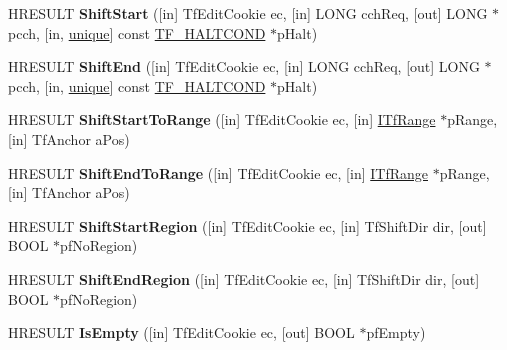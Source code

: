\begin{DoxyCompactItemize}
H\+R\+E\+S\+U\+LT {\bfseries Shift\+Start} (\mbox{[}in\mbox{]} Tf\+Edit\+Cookie ec, \mbox{[}in\mbox{]} L\+O\+NG cch\+Req, \mbox{[}out\mbox{]} L\+O\+NG $\ast$pcch, \mbox{[}in, \hyperlink{interfaceunique}{unique}\mbox{]} const \hyperlink{struct_i_tf_range_1_1_t_f___h_a_l_t_c_o_n_d}{T\+F\+\_\+\+H\+A\+L\+T\+C\+O\+ND} $\ast$p\+Halt)
\item 
\mbox{\label{interface_i_tf_range_a9195f598bcfd24904ea856f74e9dafe5}} 
H\+R\+E\+S\+U\+LT {\bfseries Shift\+End} (\mbox{[}in\mbox{]} Tf\+Edit\+Cookie ec, \mbox{[}in\mbox{]} L\+O\+NG cch\+Req, \mbox{[}out\mbox{]} L\+O\+NG $\ast$pcch, \mbox{[}in, \hyperlink{interfaceunique}{unique}\mbox{]} const \hyperlink{struct_i_tf_range_1_1_t_f___h_a_l_t_c_o_n_d}{T\+F\+\_\+\+H\+A\+L\+T\+C\+O\+ND} $\ast$p\+Halt)
\item 
\mbox{\label{interface_i_tf_range_a00e928660919fcf7e2f1c5be080e9026}} 
H\+R\+E\+S\+U\+LT {\bfseries Shift\+Start\+To\+Range} (\mbox{[}in\mbox{]} Tf\+Edit\+Cookie ec, \mbox{[}in\mbox{]} \hyperlink{interface_i_tf_range}{I\+Tf\+Range} $\ast$p\+Range, \mbox{[}in\mbox{]} Tf\+Anchor a\+Pos)
\item 
\mbox{\label{interface_i_tf_range_a4a416d81f450132723cbb81c3cc76772}} 
H\+R\+E\+S\+U\+LT {\bfseries Shift\+End\+To\+Range} (\mbox{[}in\mbox{]} Tf\+Edit\+Cookie ec, \mbox{[}in\mbox{]} \hyperlink{interface_i_tf_range}{I\+Tf\+Range} $\ast$p\+Range, \mbox{[}in\mbox{]} Tf\+Anchor a\+Pos)
\item 
\mbox{\label{interface_i_tf_range_ac47c6bf380fef398c826ccee5c17d767}} 
H\+R\+E\+S\+U\+LT {\bfseries Shift\+Start\+Region} (\mbox{[}in\mbox{]} Tf\+Edit\+Cookie ec, \mbox{[}in\mbox{]} Tf\+Shift\+Dir dir, \mbox{[}out\mbox{]} B\+O\+OL $\ast$pf\+No\+Region)
\item 
\mbox{\label{interface_i_tf_range_a79ea858c7a98463a7e62fbc46758ce60}} 
H\+R\+E\+S\+U\+LT {\bfseries Shift\+End\+Region} (\mbox{[}in\mbox{]} Tf\+Edit\+Cookie ec, \mbox{[}in\mbox{]} Tf\+Shift\+Dir dir, \mbox{[}out\mbox{]} B\+O\+OL $\ast$pf\+No\+Region)
\item 
\mbox{\label{interface_i_tf_range_a386133746110b1a417552c848d337643}} 
H\+R\+E\+S\+U\+LT {\bfseries Is\+Empty} (\mbox{[}in\mbox{]} Tf\+Edit\+Cookie ec, \mbox{[}out\mbox{]} B\+O\+OL $\ast$pf\+Empty)

\end{DoxyCompactItemize}
